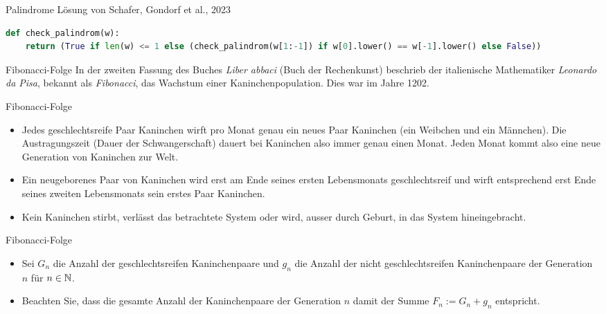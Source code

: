 \begin{frame}[fragile]{Palindrome}
Lösung von Schafer, Gondorf et al., 2023
\lstset{basicstyle=\ttfamily\scriptsize}
\begin{lstlisting}[language=Python]
def check_palindrom(w):
    return (True if len(w) <= 1 else (check_palindrom(w[1:-1]) if w[0].lower() == w[-1].lower() else False))
\end{lstlisting}
\lstset{basicstyle=\ttfamily\normalsize}
\end{frame}

\begin{frame}[fragile]{Fibonacci-Folge}
In der zweiten Fassung des Buches \textit{Liber abbaci} (Buch der Rechenkunst) beschrieb der italienische Mathematiker \textit{Leonardo da Pisa}, bekannt als \textit{Fibonacci}, das Wachstum einer Kaninchenpopulation. Dies war im Jahre 1202.
\end{frame}


\begin{frame}[fragile]{Fibonacci-Folge}
\begin{itemize}[<+->]
    \item Jedes geschlechtsreife Paar Kaninchen wirft pro Monat genau ein neues Paar Kaninchen (ein Weibchen und ein Männchen). Die Austragungszeit (Dauer der Schwangerschaft) dauert bei Kaninchen also immer genau einen Monat. Jeden Monat kommt also eine neue Generation von Kaninchen zur Welt.
    \item Ein neugeborenes Paar von Kaninchen wird erst am Ende seines ersten Lebensmonats geschlechtsreif und wirft entsprechend erst Ende seines zweiten Lebensmonats sein erstes Paar Kaninchen.
    \item Kein Kaninchen stirbt, verlässt das betrachtete System oder wird, ausser durch Geburt, in das System hineingebracht.
\end{itemize}
\end{frame}


\begin{frame}[fragile]{Fibonacci-Folge}
\begin{itemize}[<+->]
    \item Sei $G_n$ die Anzahl der geschlechtsreifen Kaninchenpaare und $g_n$ die Anzahl der nicht geschlechtsreifen Kaninchenpaare der Generation $n$ für $n\in\mathbb{N}$.
    \item Beachten Sie, dass die gesamte Anzahl der Kaninchenpaare der Generation $n$ damit der Summe $F_n := G_n+g_n$ entspricht.
\end{itemize}
\end{frame}


